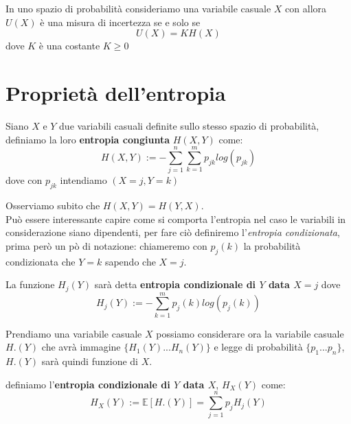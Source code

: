 \begin{teo}
In uno spazio di probabilità \spacep consideriamo una variabile casuale $X$ con \lep allora\\
$U(X)$ è una misura di incertezza se e solo se 
$$U(X)= KH(X)$$
dove $K$ è una costante $K\geq 0$
\end{teo}


\section{Proprietà dell'entropia}
\label{sec:PropriEntropia}


\begin{defi} \label{defi:congiun}
Siano $X$ e $Y$ due variabili casuali definite sullo stesso spazio di probabilità, definiamo la loro \textbf{entropia congiunta} $H(X,Y)$ come:
\begin{equation}\label{eq:congiun}
H(X,Y):=-\sum_{j=1}^n\sum_{k=1}^m p_{jk}log(p_{jk})
\end{equation}
dove con $p_{jk}$ intendiamo \p$(X=j,Y=k)$
\end{defi}

Osserviamo subito che $H(X,Y)=H(Y,X)$.\\
Può essere interessante capire come si comporta l'entropia nel caso le variabili in considerazione siano dipendenti, per fare ciò definiremo l'\textit{entropia condizionata}, prima però un pò di notazione: chiameremo con $p_{j}(k)$ la probabilità condizionata che $Y=k$ sapendo che $X=j$.
\begin{defi} \label{defi:condiz}
La funzione $H_j(Y)$ sarà detta \textbf{entropia condizionale di $Y$ data $X=j$} dove
\begin{equation}\label{eq:6.6}
H_j(Y):=-\sum_{k=1}^m p_j(k)log(p_j(k))
\end{equation}
\end{defi}

Prendiamo una variabile casuale $X$ possiamo considerare ora la variabile casuale $H.(Y)$ che avrà immagine $\{H_1(Y)...H_n(Y) \}$ e legge di probabilità $\{ p _1...p_n\}$, $H.(Y)$ sarà quindi funzione di $X$.
\begin{defi}
definiamo l'\textbf{entropia condizionale di $Y$ data $X$}, $H_X(Y)$ come:
\begin{equation}\label{eq:6.7}
H_X(Y):= \mathbb{E}[H.(Y)]= \sum_{j=1}^n p_j H_j(Y)
\end{equation}
\end{defi}

